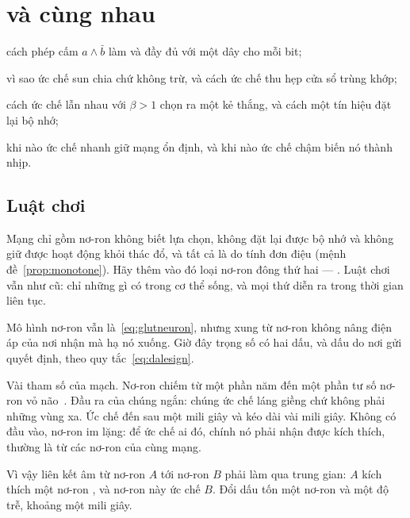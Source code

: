 \chapter{ và  cùng nhau}
\label{sec:gaba}
\begin{chaptergoals}
\item cách phép cấm $a\wedge\bar b$ làm  và  đầy đủ với một dây cho mỗi bit;
\item vì sao ức chế sun chia chứ không trừ, và cách ức chế thu hẹp cửa sổ trùng khớp;
\item cách ức chế lẫn nhau với $\beta>1$ chọn ra một kẻ thắng, và cách một tín hiệu đặt lại bộ nhớ;
\item khi nào ức chế nhanh giữ mạng ổn định, và khi nào ức chế chậm biến nó thành nhịp.
\end{chaptergoals}

\section{Luật chơi}

Mạng chỉ gồm nơ-ron  không biết lựa chọn, không đặt lại được bộ nhớ và không giữ được hoạt động khỏi thác đổ, và tất cả là do tính đơn điệu (mệnh đề~\ref{prop:monotone}). Hãy thêm vào đó loại nơ-ron đông thứ hai --- . Luật chơi vẫn như cũ: chỉ những gì có trong cơ thể sống, và mọi thứ diễn ra trong thời gian liên tục.

Mô hình nơ-ron vẫn là~\eqref{eq:glutneuron}, nhưng xung từ nơ-ron  không nâng điện áp của nơi nhận mà hạ nó xuống. Giờ đây trọng số có hai dấu, và dấu do nơi gửi quyết định, theo quy tắc~\eqref{eq:dalesign}.

Vài tham số của mạch. Nơ-ron  chiếm từ một phần năm đến một phần tư số nơ-ron vỏ não~\cite{Hendry1987}. Đầu ra của chúng ngắn: chúng ức chế láng giềng chứ không phải những vùng xa. Ức chế đến sau một mili giây và kéo dài vài mili giây. Không có đầu vào, nơ-ron  im lặng: để ức chế ai đó, chính nó phải nhận được kích thích, thường là từ các nơ-ron  của cùng mạng.

Vì vậy liên kết âm từ nơ-ron  $A$ tới nơ-ron $B$ phải làm qua trung gian: $A$ kích thích một nơ-ron , và nơ-ron này ức chế $B$. Đổi dấu tốn một nơ-ron và một độ trễ, khoảng một mili giây.

